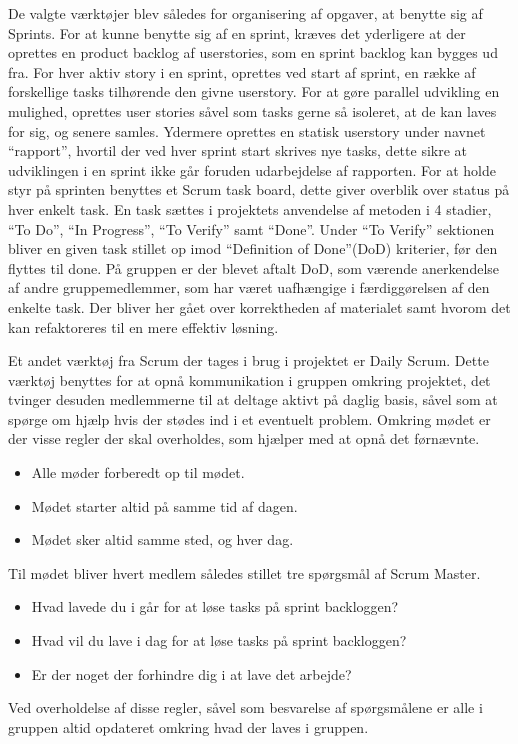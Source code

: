 De valgte værktøjer blev således for organisering af opgaver, at benytte sig af Sprints.
For at kunne benytte sig af en sprint, kræves det yderligere at der oprettes en product backlog af userstories, som en sprint backlog kan bygges ud fra.
For hver aktiv story i en sprint, oprettes ved start af sprint, en række af forskellige tasks tilhørende den givne userstory.
For at gøre parallel udvikling en mulighed, oprettes user stories såvel som tasks gerne så isoleret, at de kan laves for sig, og senere samles.
Ydermere oprettes en statisk userstory under navnet ``rapport'', hvortil der ved hver sprint start skrives nye tasks, dette sikre at udviklingen i en sprint ikke går foruden udarbejdelse af rapporten.
For at holde styr på sprinten benyttes et Scrum task board, dette giver overblik over status på hver enkelt task.
En task sættes i projektets anvendelse af metoden i 4 stadier, ``To Do'', ``In Progress'', ``To Verify'' samt ``Done''.
Under ``To Verify'' sektionen bliver en given task stillet op imod ``Definition of Done''(DoD) kriterier, før den flyttes til done.
På gruppen er der blevet aftalt DoD, som værende anerkendelse af andre gruppemedlemmer, som har været uafhængige i færdiggørelsen af den enkelte task.
Der bliver her gået over korrektheden af materialet samt hvorom det kan refaktoreres til en mere effektiv løsning.

Et andet værktøj fra Scrum der tages i brug i projektet er Daily Scrum.
Dette værktøj benyttes for at opnå kommunikation i gruppen omkring projektet, det tvinger desuden medlemmerne til at deltage aktivt på daglig basis, såvel som at spørge om hjælp hvis der stødes ind i et eventuelt problem.
Omkring mødet er der visse regler der skal overholdes, som hjælper med at opnå det førnævnte.
\begin{itemize}
  \item Alle møder forberedt op til mødet.
  \item Mødet starter altid på samme tid af dagen.
  \item Mødet sker altid samme sted, og hver dag.
\end{itemize}
Til mødet bliver hvert medlem således stillet tre spørgsmål af Scrum Master.
\begin{itemize}
  \item Hvad lavede du i går for at løse tasks på sprint backloggen?
  \item Hvad vil du lave i dag for at løse tasks på sprint backloggen?
  \item Er der noget der forhindre dig i at lave det arbejde?
\end{itemize}
Ved overholdelse af disse regler, såvel som besvarelse af spørgsmålene er alle i gruppen altid opdateret omkring hvad der laves i gruppen.

